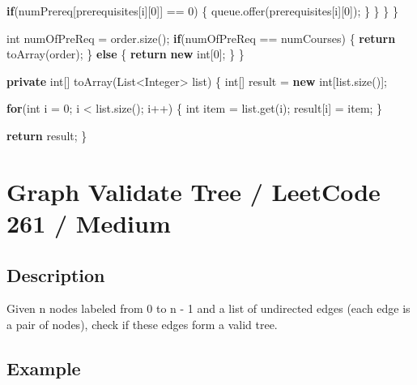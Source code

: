 \documentclass[]{book}
\newenvironment{Shaded}{\begin{snugshade}}{\end{snugshade}}
\newcommand{\BuiltInTok}[1]{#1}
\newcommand{\DataTypeTok}[1]{\textcolor[rgb]{0.13,0.29,0.53}{#1}}
\newcommand{\DecValTok}[1]{\textcolor[rgb]{0.00,0.00,0.81}{#1}}
\newcommand{\FunctionTok}[1]{\textcolor[rgb]{0.00,0.00,0.00}{#1}}
\newcommand{\KeywordTok}[1]{\textcolor[rgb]{0.13,0.29,0.53}{\textbf{#1}}}
\newcommand{\NormalTok}[1]{#1}
\begin{document}
\begin{Shaded}
\begin{Highlighting}[]
                \KeywordTok{if}\NormalTok{(numPrereq[prerequisites[i][}\DecValTok{0}\NormalTok{]] == }\DecValTok{0}\NormalTok{) \{}
\NormalTok{                    queue.}\FunctionTok{offer}\NormalTok{(prerequisites[i][}\DecValTok{0}\NormalTok{]);}
\NormalTok{                \}}
\NormalTok{            \}}
\NormalTok{        \}}
\NormalTok{    \}}

    \DataTypeTok{int}\NormalTok{ numOfPreReq = order.}\FunctionTok{size}\NormalTok{();}
    \KeywordTok{if}\NormalTok{(numOfPreReq == numCourses) \{}
        \KeywordTok{return} \FunctionTok{toArray}\NormalTok{(order);}
\NormalTok{    \} }\KeywordTok{else}\NormalTok{ \{}
        \KeywordTok{return} \KeywordTok{new} \DataTypeTok{int}\NormalTok{[}\DecValTok{0}\NormalTok{];}
\NormalTok{    \}}
\NormalTok{\}}

\KeywordTok{private} \DataTypeTok{int}\NormalTok{[] }\FunctionTok{toArray}\NormalTok{(}\BuiltInTok{List}\NormalTok{<}\BuiltInTok{Integer}\NormalTok{> list) \{}
    \DataTypeTok{int}\NormalTok{[] result = }\KeywordTok{new} \DataTypeTok{int}\NormalTok{[list.}\FunctionTok{size}\NormalTok{()];}

    \KeywordTok{for}\NormalTok{(}\DataTypeTok{int}\NormalTok{ i = }\DecValTok{0}\NormalTok{; i < list.}\FunctionTok{size}\NormalTok{(); i++) \{}
        \DataTypeTok{int}\NormalTok{ item = list.}\FunctionTok{get}\NormalTok{(i);}
\NormalTok{        result[i] = item;}
\NormalTok{    \}}

    \KeywordTok{return}\NormalTok{ result;}
\NormalTok{\}}
\end{Highlighting}
\end{Shaded}

\hypertarget{graph-validate-tree-leetcode-261-medium}{%
\section{Graph Validate Tree / LeetCode 261 / Medium}\label{graph-validate-tree-leetcode-261-medium}}

\hypertarget{description-85}{%
\subsection{Description}\label{description-85}}

Given n nodes labeled from 0 to n - 1 and a list of undirected edges (each edge is a pair of nodes), check if these
edges form a valid tree.

\hypertarget{example-81}{%
\subsection{Example}\label{example-81}}
\end{document}
